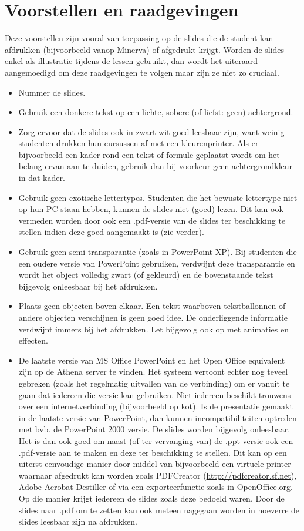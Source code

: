 \documentclass[a4paper,11pt,oneside]{article}
\newcommand{\npar}{\vspace{0.5cm} \par \noindent}      %
\begin{document}
\section{\sffamily Voorstellen en raadgevingen}
\npar Deze voorstellen zijn vooral van toepassing op de slides die de student kan afdrukken (bijvoorbeeld vanop Minerva) of afgedrukt krijgt. Worden de slides enkel als illustratie tijdens de lessen gebruikt, dan wordt het uiteraard aangemoedigd om deze raadgevingen te volgen maar zijn ze niet zo cruciaal.
\begin{itemize}
\item Nummer de slides.
\item Gebruik een donkere tekst op een lichte, sobere (of liefst: geen) achtergrond.
\item Zorg ervoor dat de slides ook in zwart-wit goed leesbaar zijn, want weinig studenten drukken hun cursussen af met een kleurenprinter. Als er bijvoorbeeld een kader rond een tekst of formule geplaatst wordt om het belang ervan aan te duiden, gebruik dan bij voorkeur geen achtergrondkleur in dat kader.
\item Gebruik geen exotische lettertypes.  Studenten die het bewuste lettertype niet op hun PC staan hebben, kunnen de slides niet (goed) lezen.  Dit kan ook vermeden worden door ook een .pdf-versie van de slides ter beschikking te stellen indien deze goed aangemaakt is (zie verder).
\item Gebruik geen semi-transparantie (zoals in PowerPoint XP). Bij studenten die een oudere versie van PowerPoint gebruiken, verdwijnt deze transparantie en wordt het object volledig zwart (of gekleurd) en de bovenstaande tekst bijgevolg onleesbaar bij het afdrukken.
\item Plaats geen objecten boven elkaar.  Een tekst waarboven tekstballonnen of andere objecten verschijnen is geen goed idee.  De onderliggende informatie verdwijnt immers bij het afdrukken.  Let bijgevolg ook op met animaties en effecten.
\item De laatste versie van MS Office PowerPoint en het Open Office equivalent zijn op de Athena server te vinden. Het systeem vertoont echter nog teveel gebreken (zoals het regelmatig uitvallen van de verbinding) om er vanuit te gaan dat iedereen die versie kan gebruiken. Niet iedereen beschikt trouwens over een internetverbinding (bijvoorbeeld op kot).  Is de presentatie gemaakt in de laatste versie van PowerPoint, dan kunnen incompatibiliteiten optreden met bvb. de PowerPoint 2000 versie. De slides worden bijgevolg onleesbaar.  Het is dan ook goed om naast (of ter vervanging van) de .ppt-versie ook een .pdf-versie aan te maken en deze ter beschikking te stellen.  Dit kan op een uiterst eenvoudige manier door middel van bijvoorbeeld een virtuele printer waarnaar afgedrukt kan worden zoals PDFCreator (\url{http://pdfcreator.sf.net}), Adobe Acrobat Destiller of via een exporteerfunctie zoals in OpenOffice.org.  Op die manier krijgt iedereen de slides zoals deze bedoeld waren. Door de slides naar .pdf om te zetten kan ook meteen nagegaan worden in hoeverre de slides leesbaar zijn na afdrukken. 

\end{itemize}
\end{document}
